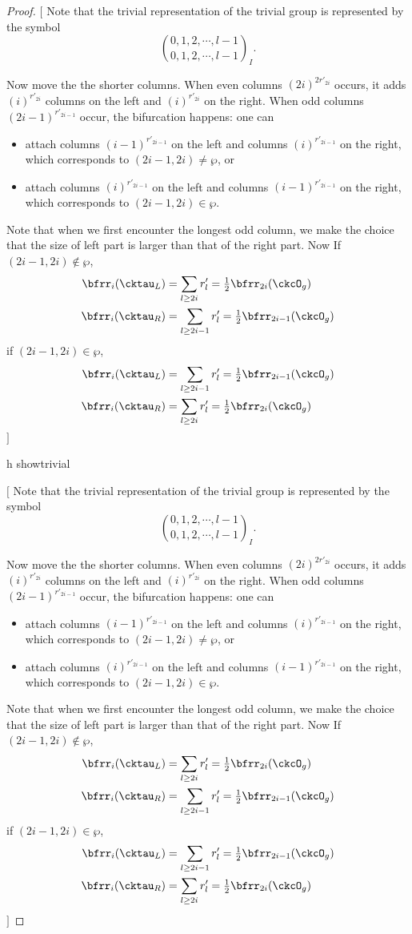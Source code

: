 \documentclass[12pt,a4paper]{amsart}
\newcommand{\trivial}[2][]{\if\relax\detokenize{#1}\relax
  {%
      \color{orange} \vspace{0em} $[$  #2 $]$
      \color{black}
  }
  \else
\ifx#1h
\ifcsname showtrivial\endcsname
{%
    \color{orange} \vspace{0em}  $[$ #2 $]$
    \color{black}
}
\fi
\else {\red Wrong argument!} \fi
\fi
}
\numberwithin{equation}{section}
\theoremstyle{remark}
\def\half{{\tfrac{1}{2}}}
\begin{document}
\begin{proof}
    \trivial[]{ Note that the trivial representation of the trivial group is
      represented by the symbol
      \[
        \binom{0,1, 2, \cdots, l-1}{0,1,2, \cdots, l-1}_{I}.
      \]

      Now move the the shorter columns. When even columns $(2i)^{2r'_{2i}}$
      occurs, it adds $(i)^{r'_{2i}}$ columns on the left and $(i)^{r'_{2i}}$ on
      the right. When odd columns $(2i-1)^{r'_{2i-1}}$ occur, the bifurcation
      happens: one can
      \begin{itemize}
        \item attach columns $(i-1)^{r'_{2i-1}}$ on the left and columns
              $(i)^{r'_{2i-1}}$ on the right, which corresponds to
              $(2i-1,2i)\neq \wp$, or
        \item attach columns $(i)^{r'_{2i-1}}$ on the left and columns
              $(i-1)^{r'_{2i-1}}$ on the right, which corresponds to
              $(2i-1,2i)\in \wp$.
      \end{itemize}
      Note that when we first encounter the longest odd column, we make the
      choice that the size of left part is larger than that of the right part.
      Now If $(2i-1,2i)\notin \wp$,
      \[
        \begin{split}
          \bfrr_{i}(\cktau_{L}) & = \sum_{l\geq 2i} r'_{l}
          = \half\bfrr_{2i}(\ckcO_{g})\\
          \bfrr_{i}(\cktau_{R}) & = \sum_{l\geq 2i-1} r'_{l} = \half\bfrr_{2i-1}(\ckcO_{g})
        \end{split}
      \]
      if $(2i-1,2i)\in \wp$,
      \[
        \begin{split}
          \bfrr_{i}(\cktau_{L}) & = \sum_{l\geq 2i-1} r'_{l}
          = \half\bfrr_{2i-1}(\ckcO_{g})\\
          \bfrr_{i}(\cktau_{R}) & = \sum_{l\geq 2i} r'_{l} = \half\bfrr_{2i}(\ckcO_{g})
        \end{split}
      \]
    }



\end{proof}
\end{document}
